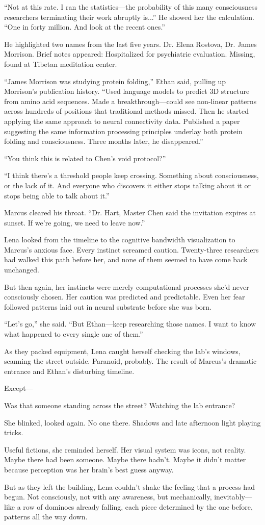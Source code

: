 ``Not at this rate. I ran the statistics—the probability of this many consciousness researchers terminating their work abruptly is...'' He showed her the calculation. ``One in forty million. And look at the recent ones.''

He highlighted two names from the last five years. Dr. Elena Rostova, Dr. James Morrison. Brief notes appeared: Hospitalized for psychiatric evaluation. Missing, found at Tibetan meditation center.

``James Morrison was studying protein folding,'' Ethan said, pulling up Morrison's publication history. ``Used language models to predict 3D structure from amino acid sequences. Made a breakthrough—could see non-linear patterns across hundreds of positions that traditional methods missed. Then he started applying the same approach to neural connectivity data. Published a paper suggesting the same information processing principles underlay both protein folding and consciousness. Three months later, he disappeared.''

``You think this is related to Chen's void protocol?''

``I think there's a threshold people keep crossing. Something about consciousness, or the lack of it. And everyone who discovers it either stops talking about it or stops being able to talk about it.''

Marcus cleared his throat. ``Dr. Hart, Master Chen said the invitation expires at sunset. If we're going, we need to leave now.''

Lena looked from the timeline to the cognitive bandwidth visualization to Marcus's anxious face. Every instinct screamed caution. Twenty-three researchers had walked this path before her, and none of them seemed to have come back unchanged.

But then again, her instincts were merely computational processes she'd never consciously chosen. Her caution was predicted and predictable. Even her fear followed patterns laid out in neural substrate before she was born.

``Let's go,'' she said. ``But Ethan—keep researching those names. I want to know what happened to every single one of them.''

As they packed equipment, Lena caught herself checking the lab's windows, scanning the street outside. Paranoid, probably. The result of Marcus's dramatic entrance and Ethan's disturbing timeline.

Except—

Was that someone standing across the street? Watching the lab entrance?

She blinked, looked again. No one there. Shadows and late afternoon light playing tricks.

Useful fictions, she reminded herself. Her visual system was icons, not reality. Maybe there had been someone. Maybe there hadn't. Maybe it didn't matter because perception was her brain's best guess anyway.

But as they left the building, Lena couldn't shake the feeling that a process had begun. Not consciously, not with any awareness, but mechanically, inevitably—like a row of dominoes already falling, each piece determined by the one before, patterns all the way down.
